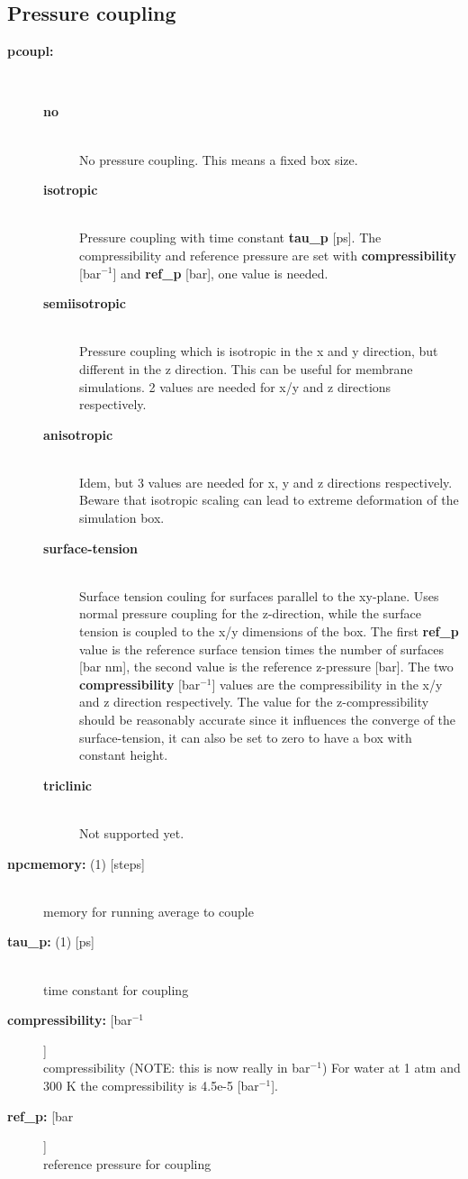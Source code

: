 \subsection{Pressure coupling}
\begin{description}
\item[{\bf pcoupl:}]\mbox{}\\
\vspace{-2ex}\begin{description}
\item[{\bf no}]\mbox{}\\
No pressure coupling. This means a fixed box size.
\item[{\bf isotropic}]\mbox{}\\
Pressure coupling with time constant {\bf tau\_p} [ps].
The compressibility and reference pressure are set with
{\bf compressibility} [bar$^{-1}$] and {\bf ref\_p} [bar], one
value is needed.
\item[{\bf semiisotropic}]\mbox{}\\
Pressure coupling which is isotropic in the x and y direction,
but different in the z direction.
This can be useful for membrane simulations.
2 values are needed for x/y and z directions respectively.
\item[{\bf anisotropic}]\mbox{}\\
Idem, but 3 values are needed for x, y and z directions respectively.
Beware that isotropic scaling can lead to extreme deformation
of the simulation box.
\item[{\bf surface-tension}]\mbox{}\\
Surface tension couling for surfaces parallel to the xy-plane.
Uses normal pressure coupling for the z-direction, while the surface tension
is coupled to the x/y dimensions of the box.
The first {\bf ref\_p} value is the reference surface tension times
the number of surfaces [bar nm], 
the second value is the reference z-pressure [bar].
The two {\bf compressibility} [bar$^{-1}$] values are the compressibility
in the x/y and z direction respectively.
The value for the z-compressibility should be reasonably accurate since it
influences the converge of the surface-tension, it can also be set to zero
to have a box with constant height.
\item[{\bf triclinic}]\mbox{}\\
Not supported yet.
\end{description}
\item[{\bf npcmemory: }(1) {[steps]}]\mbox{}\\
memory for running average to couple
\item[{\bf tau\_p: }(1) {[ps]}]\mbox{}\\
time constant for coupling
\item[{\bf compressibility: }[bar$^{-1}$]]\mbox{}\\
compressibility (NOTE: this is now really in bar$^{-1}$)
For water at 1 atm and 300 K the compressibility is 4.5e-5 [bar$^{-1}$].
\item[{\bf ref\_p: }[bar]]\mbox{}\\
reference pressure for coupling
\end{description}

